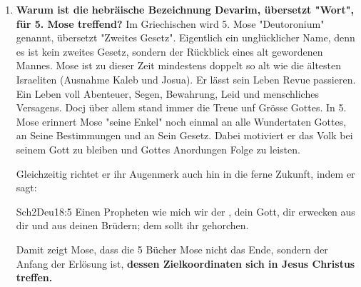 \begin{enumerate}
\begin{bibeltext}{Sch2}{Num}{14:16-22}
        Da sprach der \herr : Ich habe vergeben nach deinem Wort. Aber - so war ich lebe und die ganze Erde mit der Herrlichkeit des \herr n erfüllt werden soll. Keiner der Männer, die meine Herrlichkeit und meine Zeichen gesehen haben, die ich in Ägypten und in der Wüste getan habe, und die mich nun schon zehnmal versucht und meiner Stimme nicht gehorcht haben.
    \end{bibeltext}
    Entsprechend beginnt eine 40-jährige Wüstenwanderung voller Not und Elend, bis alle, die Gottes Wege verwarfen, in der Wüste starben und somit das Land der Verheissung nicht zu sehen bekamen.
    \item \textbf{Warum ist die hebräische Bezeichnung Devarim, übersetzt "Wort", für 5. Mose treffend?}
    Im Griechischen wird 5. Mose "Deutoronium" genannt, übersetzt "Zweites Gesetz". Eigentlich ein unglücklicher Name, denn es ist kein zweites Gesetz, sondern der Rückblick eines alt gewordenen Mannes. Mose ist zu dieser Zeit mindestens doppelt so alt wie die ältesten Israeliten (Ausnahme Kaleb und Josua). Er lässt sein Leben Revue passieren. Ein Leben voll Abenteuer, Segen, Bewahrung, Leid und menschliches Versagens. Docj über allem stand immer die Treue unf Grösse Gottes. In 5. Mose erinnert Mose "seine Enkel" noch einmal an alle Wundertaten Gottes, an Seine Bestimmungen und an Sein Gesetz. Dabei motiviert er das Volk bei seinem Gott zu bleiben und Gottes Anordungen Folge zu leisten.

    Gleichzeitig richtet er ihr Augenmerk auch hin in die ferne Zukunft, indem er sagt:
    \begin{bibeltext}{Sch2}{Deu}{18:5}
        Einen Propheten wie mich wir der \herr , dein Gott, dir erwecken aus dir und aus deinen Brüdern; dem sollt ihr gehorchen.
    \end{bibeltext}
    Damit zeigt Mose, dass die 5 Bücher Mose nicht das Ende, sondern der Anfang der Erlösung ist, \textbf{dessen Zielkoordinaten sich in Jesus Christus treffen.}

\end{enumerate}